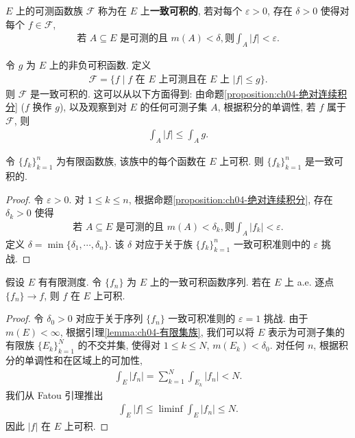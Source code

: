 \documentclass[../../main.tex]{subfiles}
\begin{document}
\begin{definition}[一致可积]\label{definition:ch04-一致可积}
$E$ 上的可测函数族 $\mathcal{F}$ 称为在 $E$ 上\textbf{一致可积的}, 若对每个 $\varepsilon>0$, 存在 $\delta>0$ 使得对每个 $f\in\mathcal{F}$,
\begin{align}
\text{若 }A\subseteq E\text{ 是可测的且 }m(A)<\delta,\text{则}\int_{A}|f|<\varepsilon.\label{align:ch04-一致可积定义}
\end{align}
\end{definition}

\begin{example}\label{example:ch04-一致可积例}
令 $g$ 为 $E$ 上的非负可积函数. 定义
\begin{align*}
\mathcal{F}=\{f\mid f\text{ 在 }E\text{ 上可测且在 }E\text{ 上 }|f|\leqslant g\}.
\end{align*}
则 $\mathcal{F}$ 是一致可积的. 这可以从以下方面得到: 由命题\cref{proposition:ch04-绝对连续积分} ($f$ 换作 $g$), 以及观察到对 $E$ 的任何可测子集 $A$, 根据积分的单调性, 若 $f$ 属于 $\mathcal{F}$, 则
\begin{align*}
\int_{A}|f|\leqslant\int_{A}g.
\end{align*}
\end{example}

\begin{proposition}\label{proposition:ch04-有限族一致}
令 $\{f_{k}\}_{k=1}^{n}$ 为有限函数族, 该族中的每个函数在 $E$ 上可积. 则 $\{f_{k}\}_{k=1}^{n}$ 是一致可积的.
\end{proposition}

\begin{proof}
令 $\varepsilon>0$. 对 $1\leqslant k\leqslant n$, 根据命题\cref{proposition:ch04-绝对连续积分}, 存在 $\delta_{k}>0$ 使得
\begin{align}
\text{若 }A\subseteq E\text{ 是可测的且 }m(A)<\delta_{k},\text{则}\int_{A}|f_{k}|<\varepsilon.\label{align:ch04-单函数估计}
\end{align}
定义 $\delta=\min\{\delta_{1},\cdots,\delta_{n}\}$. 该 $\delta$ 对应于关于族 $\{f_{k}\}_{k=1}^{n}$ 一致可积准则中的 $\varepsilon$ 挑战.
\end{proof}

\begin{proposition}\label{proposition:ch04-极限可积}
假设 $E$ 有有限测度. 令 $\{f_{n}\}$ 为 $E$ 上的一致可积函数序列. 若在 $E$ 上 a.e. 逐点 $\{f_{n}\}\to f$, 则 $f$ 在 $E$ 上可积.
\end{proposition}

\begin{proof}
令 $\delta_{0}>0$ 对应于关于序列 $\{f_{n}\}$ 一致可积准则的 $\varepsilon=1$ 挑战. 由于 $m(E)<\infty$, 根据引理\cref{lemma:ch04-有限集族}, 我们可以将 $E$ 表示为可测子集的有限族 $\{E_{k}\}_{k=1}^{N}$ 的不交并集, 使得对 $1\leqslant k\leqslant N$, $m(E_{k})<\delta_{0}$. 对任何 $n$, 根据积分的单调性和在区域上的可加性,
\begin{align*}
\int_{E}|f_{n}|=\sum_{k=1}^{N}\int_{E_{k}}|f_{n}|<N.
\end{align*}
我们从 Fatou 引理推出
\begin{align*}
\int_{E}|f|\leqslant\liminf\int_{E}|f_{n}|\leqslant N.
\end{align*}
因此 $|f|$ 在 $E$ 上可积.
\end{proof}
\end{document}
